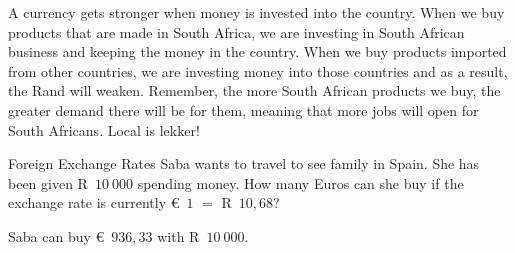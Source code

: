 A currency gets stronger when money is invested into the country. When we buy products that are made in South Africa, we are investing in South African business and keeping the money in the country. When we buy products imported from other countries, we are investing money into those countries and as a result, the Rand will weaken. Remember, the more South African products we buy, the greater demand there will be for them, meaning that more jobs will open for South Africans. Local is lekker!


\begin{wex}{Foreign Exchange Rates}
    {Saba wants to travel to see family in Spain. She has been given R~$10~000$ spending money. How many Euros can she buy if the exchange rate is currently €~$1$ $=$ R~$10,68$?}{
    
    Saba can buy €~$936,33$ with R~$10~000$.
}
\end{wex}


